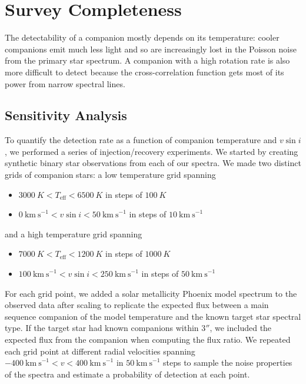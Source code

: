 \documentclass{emulateapj}
\begin{document}
\section{Survey Completeness}
\label{sec:completeness}

The detectability of a companion mostly depends on its temperature: cooler companions emit much less light and so are increasingly lost in the Poisson noise from the primary star spectrum. A companion with a high rotation rate is also more difficult to detect because the cross-correlation function gets most of its power from narrow spectral lines.  

\subsection{Sensitivity Analysis}

To quantify the detection rate as a function of companion temperature and $v\sin{i}$, we performed a series of injection/recovery experiments. We started by creating synthetic binary star observations from each of our spectra. We made two distinct grids of companion stars: a low temperature grid spanning

\begin{itemize}
\item $3000\ K < T_\mathrm{eff} < 6500\ K$ in steps of $100\ K$
\item $0\ \mathrm{km\ s}^{-1} < v\sin{i} < 50\ \mathrm{km\ s}^{-1}$ in steps of $10\ \mathrm{km\ s}^{-1}$
\end{itemize}
and a high temperature grid spanning

\begin{itemize}
\item $7000\ K < T_\mathrm{eff} < 1200\ K$ in steps of $1000\ K$
\item $100\ \mathrm{km\ s}^{-1} < v\sin{i} < 250\ \mathrm{km\ s}^{-1}$ in steps of $50\ \mathrm{km\ s}^{-1}$
\end{itemize}
For each grid point, we added a solar metallicity Phoenix model spectrum to the observed data after scaling to replicate the expected flux between a main sequence companion of the model temperature and the known target star spectral type. If the target star had known companions within $3''$, we included the expected flux from the companion when computing the flux ratio. We repeated each grid point at different radial velocities spanning $-400\ \mathrm{km\ s}^{-1} < v < 400\ \mathrm{km\ s}^{-1}$ in $50\ \mathrm{km\ s}^{-1}$ steps to sample the noise properties of the spectra and estimate a probability of detection at each point.
\end{document}
